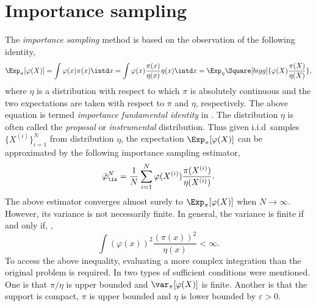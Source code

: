 \section{Importance sampling}
\label{sec:Importance sampling}

The \emph{importance sampling} method is based on the observation of the
following identity,
\begin{equation}
  \Exp_{\pi}[\varphi(X)]
  = \int\varphi(x)\pi(x)\intd x
  = \int\varphi(x)\frac{\pi(x)}{\eta(x)}\eta(x)\intd x
  = \Exp_{\eta}\Square[bigg]{\varphi(X)\frac{\pi(X)}{\eta(X)}},
  \label{eq:impotance fundamental}
\end{equation}
where $\eta$ is a distribution with respect to which $\pi$ is absolutely
continuous and the two expectations are taken with respect to $\pi$ and
$\eta$, respectively. The above equation is termed \emph{importance
fundamental identity} in \cite{Robert:2004tn}. The distribution $\eta$ is
often called the \emph{proposal} or \emph{instrumental} distribution. Thus
given i.i.d\ samples $\{X^{(i)}\}_{i=1}^N$ from distribution $\eta$, the
expectation $\Exp_{\pi}[\varphi(X)]$ can be approximated by the following
importance sampling estimator,
\begin{equation}
  \hat\varphi_{\is}^N
  = \frac{1}{N}\sum_{i=1}^N\varphi(X^{(i)})\frac{\pi(X^{(i)})}{\eta(X^{(i)})}.
  \label{eq:is normalized}
\end{equation}
The above estimator converges almost surely to $\Exp_{\pi}[\varphi(X)]$ when
$N\to\infty$. However, its variance is not necessarily finite. In general, the
variance is finite if and only if, \cite[][sec.~3.3.2]{Robert:2004tn},
\begin{equation}
  \int(\varphi(x))^2\frac{(\pi(x))^2}{\eta(x)} < \infty.
\end{equation}
To access the above inequality, evaluating a more complex integration than the
original problem is required. In \cite{Geweke:1989tm} two types of sufficient
conditions were mentioned. One is that $\pi/\eta$ is upper bounded and
$\var_{\pi}[\varphi(X)]$ is finite. Another is that the support is compact,
$\pi$ is upper bounded and $\eta$ is lower bounded by $\varepsilon > 0$.

